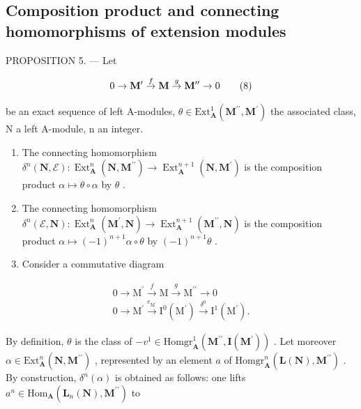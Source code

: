 \subsection{Composition product and connecting homomorphisms of extension modules}

PROPOSITION 5. — Let

\[
0 \to {\bf M} ^ {\prime} \stackrel {f} {\to} {\bf M} \stackrel {g} {\to} {\bf M} ^ {\prime \prime} \to 0\tag{8}
\]

be an exact sequence of left A-modules, \(\theta\in\mathrm{Ext}_{\mathbf{A}}^{1}\left(\mathbf{M}^{\prime\prime},\mathbf{M}^{\prime}\right)\) the associated class, N a left A-module, n an integer.

\begin{enumerate}
\def\labelenumi{\alph{enumi})}
\item
  The connecting homomorphism \(\delta^{n}(\mathbf{N},\mathcal{E}):\operatorname{Ext}_{\mathbf{A}}^{n}(\mathbf{N},\mathbf{M}^{\prime \prime})\to \operatorname{Ext}_{\mathbf{A}}^{n + 1}(\mathbf{N},\mathbf{M}^{\prime})\) is the composition product \(\alpha \mapsto \theta \circ \alpha\) by \(\theta\) .
\item
  The connecting homomorphism \(\delta^{n}(\mathcal{E},\mathbf{N}):\operatorname{Ext}_{\mathbf{A}}^{n}(\mathbf{M}^{\prime},\mathbf{N})\to\operatorname{Ext}_{\mathbf{A}}^{n+1}(\mathbf{M}^{\prime\prime},\mathbf{N})\) is the composition product \(\alpha\mapsto(-1)^{n+1}\alpha\circ\theta\) by \((-1)^{n+1}\theta\) .
\item
  Consider a commutative diagram
\end{enumerate}

\[
\begin{array}{l} 0 \xrightarrow {} \mathrm{M} ^ {\prime} \xrightarrow {f} \mathrm{M} \xrightarrow {g} \mathrm{M} ^ {\prime \prime} \xrightarrow {} 0 \\ 0 \xrightarrow {} \mathrm{M} ^ {\prime} \xrightarrow {e _ {\mathrm{M} ^ {\prime}}} \mathrm{I} ^ {0} (\mathrm{M} ^ {\prime}) \xrightarrow {\delta^ {0}} \mathrm{I} ^ {1} (\mathrm{M} ^ {\prime}). \end{array}
\]

By definition, \(\theta\) is the class of \(-v^{1}\in\mathrm{Homgr}_{\mathbf{A}}^{1}(\mathbf{M}^{\prime\prime},\mathbf{I}(\mathbf{M}^{\prime}))\) . Let moreover \(\alpha\in\mathrm{Ext}_{\mathbf{A}}^{n}(\mathbf{N},\mathbf{M}^{\prime\prime})\) , represented by an element \(a\) of \(\mathrm{Homgr}_{\mathbf{A}}^{n}(\mathbf{L}(\mathbf{N}),\mathbf{M}^{\prime\prime})\) . By construction, \(\delta^{n}(\alpha)\) is obtained as follows: one lifts \(a^{n}\in\mathrm{Hom}_{\mathbf{A}}(\mathbf{L}_{n}(\mathbf{N}),\mathbf{M}^{\prime\prime})\) to


